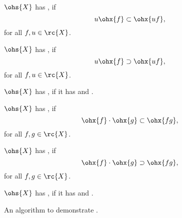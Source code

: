 \documentclass[b5paper, english, oneside]{memoir}
\begin{document}
\begin{definition}
$\ohs{X}$ has , if
\begin{equation}
u \ohx{f} \subset \ohx{uf},
\end{equation}
for all $f, u \in \rc{X}$.
\end{definition}

\begin{definition}
$\ohs{X}$ has , if
\begin{equation}
u \ohx{f} \supset \ohx{uf},
\end{equation}
for all $f, u \in \rc{X}$.
\end{definition}

\begin{definition}
$\ohs{X}$ has , if it has  and .
\end{definition}

\begin{definition}
$\ohs{X}$ has , if
\begin{equation}
\ohx{f} \cdot \ohx{g} \subset \ohx{fg},
\end{equation}
for all $f, g \in \rc{X}$.
\end{definition}

\begin{definition}
$\ohs{X}$ has , if
\begin{equation}
\ohx{f} \cdot \ohx{g} \supset \ohx{fg},
\end{equation}
for all $f, g \in \rc{X}$.
\end{definition}

\begin{definition}
$\ohs{X}$ has , if it has  and .
\end{definition}

\begin{algorithm}
\caption{An algorithm to demonstrate .}
\label{alg:multiply}
\begin{algorithmic}[1]
  \State {}
\EndFor
\EndProcedure
\end{algorithmic}
\end{algorithm}
\end{document}

